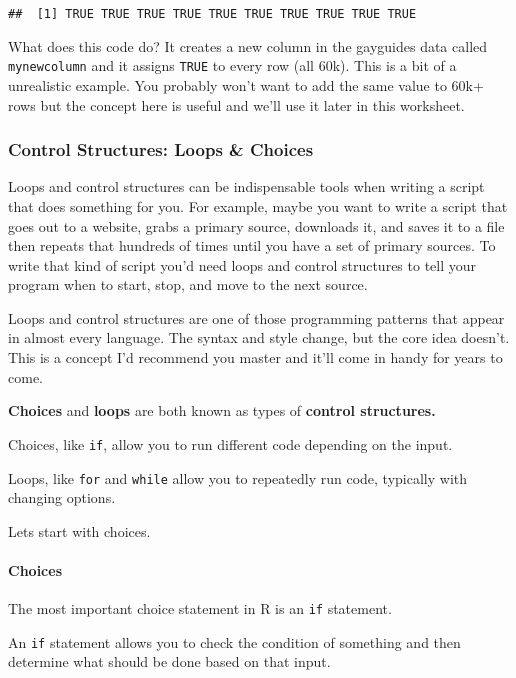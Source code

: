 \documentclass[
]{article}
\begin{document}
\begin{verbatim}
##  [1] TRUE TRUE TRUE TRUE TRUE TRUE TRUE TRUE TRUE TRUE
\end{verbatim}

What does this code do? It creates a new column in the gayguides data
called \texttt{mynewcolumn} and it assigns \texttt{TRUE} to every row
(all 60k). This is a bit of a unrealistic example. You probably won't
want to add the same value to 60k+ rows but the concept here is useful
and we'll use it later in this worksheet.

\hypertarget{control-structures-loops-choices}{%
\subsubsection{Control Structures: Loops \&
Choices}\label{control-structures-loops-choices}}

Loops and control structures can be indispensable tools when writing a
script that does something for you. For example, maybe you want to write
a script that goes out to a website, grabs a primary source, downloads
it, and saves it to a file then repeats that hundreds of times until you
have a set of primary sources. To write that kind of script you'd need
loops and control structures to tell your program when to start, stop,
and move to the next source.

Loops and control structures are one of those programming patterns that
appear in almost every language. The syntax and style change, but the
core idea doesn't. This is a concept I'd recommend you master and it'll
come in handy for years to come.

\textbf{Choices} and \textbf{loops} are both known as types of
\textbf{control structures.}

Choices, like \texttt{if}, allow you to run different code depending on
the input.

Loops, like \texttt{for} and \texttt{while} allow you to repeatedly run
code, typically with changing options.

Lets start with choices.

\hypertarget{choices}{%
\paragraph{Choices}\label{choices}}

The most important choice statement in R is an \texttt{if} statement.

An \texttt{if} statement allows you to check the condition of something
and then determine what should be done based on that input.
\end{document}
